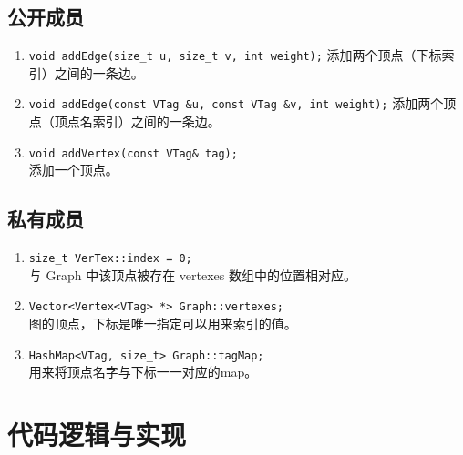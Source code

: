 {
\subsection{公开成员}
\begin{enumerate}
    \item \lstinline{void addEdge(size_t u, size_t v, int weight);}
          添加两个顶点（下标索引）之间的一条边。
    \item \lstinline{void addEdge(const VTag &u, const VTag &v, int weight);}
          添加两个顶点（顶点名索引）之间的一条边。
    \item \lstinline{void addVertex(const VTag& tag);} \\
          添加一个顶点。
\end{enumerate}

\subsection{私有成员}
\begin{enumerate}
    \item \lstinline{size_t VerTex::index = 0;} \\
          与 Graph 中该顶点被存在 vertexes 数组中的位置相对应。
    \item \lstinline{Vector<Vertex<VTag> *> Graph::vertexes;} \\
          图的顶点，下标是唯一指定可以用来索引的值。
    \item \lstinline{HashMap<VTag, size_t> Graph::tagMap;} \\
          用来将顶点名字与下标一一对应的map。
\end{enumerate}
}

\section{代码逻辑与实现}

